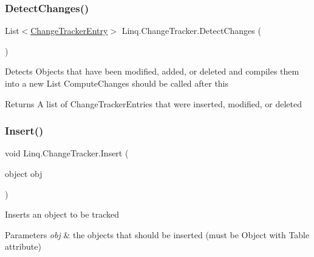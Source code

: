 \subsubsection{\texorpdfstring{Detect\+Changes()}{DetectChanges()}}
{\footnotesize\ttfamily List$<$\mbox{\hyperlink{class_linq_1_1_change_tracker_entry}{Change\+Tracker\+Entry}}$>$ Linq.\+Change\+Tracker.\+Detect\+Changes (\begin{DoxyParamCaption}{ }\end{DoxyParamCaption})\hspace{0.3cm}{\ttfamily [inline]}}



Detects Objects that have been modified, added, or deleted and compiles them into a new List Compute\+Changes should be called after this 

\begin{DoxyReturn}{Returns}
A list of Change\+Tracker\+Entries that were inserted, modified, or deleted
\end{DoxyReturn}
\mbox{\label{class_linq_1_1_change_tracker_aa53380f4a4352608f221ea918815d7c1}} 
\subsubsection{\texorpdfstring{Insert()}{Insert()}}
{\footnotesize\ttfamily void Linq.\+Change\+Tracker.\+Insert (\begin{DoxyParamCaption}\item[{object}]{obj }\end{DoxyParamCaption})\hspace{0.3cm}{\ttfamily [inline]}}



Inserts an object to be tracked 


\begin{DoxyParams}{Parameters}
{\em obj} & the objects that should be inserted (must be Object with Table attribute)\\
\hline
\end{DoxyParams}
\mbox{\label{class_linq_1_1_change_tracker_ab0d470a3095ae5a0a7ae80fbfdcf614b}} 
